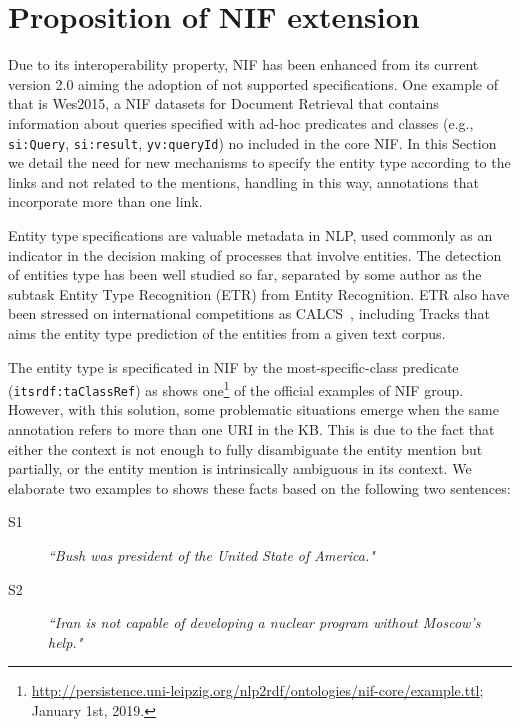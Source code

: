 \documentclass{llncs}
\begin{document}
\section{Proposition of NIF extension}
\label{sec:nifmod}

Due to its interoperability property, NIF has been enhanced from its current version 2.0 aiming the adoption of not supported specifications. One example of that is Wes2015, a NIF datasets for Document Retrieval that contains information about queries specified with ad-hoc predicates and classes (e.g., \texttt{si:Query}, \texttt{si:result}, \texttt{yv:queryId}) no included in the core NIF. In this Section we detail the need for new mechanisms to specify the entity type according to the links and not related to the mentions, handling in this way, annotations that incorporate more than one link.

Entity type specifications are valuable metadata in NLP, used commonly as an indicator in the decision making of processes that involve entities. The detection of entities type has been well studied so far, separated by some author as the subtask Entity Type Recognition (ETR) from Entity Recognition. ETR also have been stressed on international competitions as CALCS~\cite{calcs2018shtask}, including Tracks that aims the entity type prediction of the entities from a given text corpus. 

The entity type is specificated in NIF by the most-specific-class predicate (\texttt{itsrdf:taClassRef}) as shows one\footnote{\url{http://persistence.uni-leipzig.org/nlp2rdf/ontologies/nif-core/example.ttl}; January 1st, 2019.} of the official examples of NIF group. However, with this solution, some problematic situations emerge when the same annotation refers to more than one URI in the KB. This is due to the fact that either the context is not enough to fully disambiguate the entity mention but partially, or the entity mention is intrinsically ambiguous in its context. We elaborate two examples to shows these facts based on the following two sentences:

\begin{description}
\item[S1] \textit{``Bush was president of the United State of America."}
\item[S2] \textit{``Iran is not capable of developing a nuclear program without Moscow's help."}
\end{description}
\end{document}
